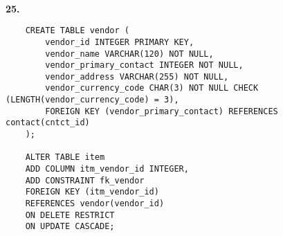 \documentclass[letterpaper,11pt]{article}
\newcommand{\Paragraph}[1]{~\vspace*{-0.7\baselineskip}\\{\bf #1}}
\begin{document}
\Paragraph{25.}
\begin{verbatim}
	CREATE TABLE vendor (
		vendor_id INTEGER PRIMARY KEY,              
		vendor_name VARCHAR(120) NOT NULL,          
		vendor_primary_contact INTEGER NOT NULL,
		vendor_address VARCHAR(255) NOT NULL,       
		vendor_currency_code CHAR(3) NOT NULL CHECK (LENGTH(vendor_currency_code) = 3), 
		FOREIGN KEY (vendor_primary_contact) REFERENCES contact(cntct_id) 
	);

	ALTER TABLE item
	ADD COLUMN itm_vendor_id INTEGER,               
	ADD CONSTRAINT fk_vendor                        
	FOREIGN KEY (itm_vendor_id) 
	REFERENCES vendor(vendor_id)                    
	ON DELETE RESTRICT                              
	ON UPDATE CASCADE;                   

\end{verbatim}
\end{document}
